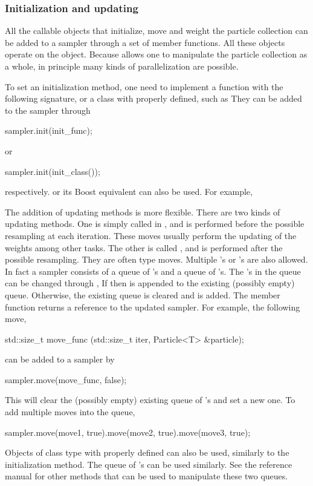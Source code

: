 \subsubsection{Initialization and updating}
\label{ssub:Initialization and updating}

All the callable objects that initialize, move and weight the particle
collection can be added to a sampler through a set of member functions. All
these objects operate on the  object. Because \vsmc
allows one to manipulate the particle collection as a whole, in principle many
kinds of parallelization are possible.

To set an initialization method, one need to implement a function with the
following signature,
or a class with  properly defined, such as
They can be added to the sampler through
\begin{cppcode}
sampler.init(init_func);
\end{cppcode}
or
\begin{cppcode}
sampler.init(init_class());
\end{cppcode}
respectively. \cppoo{}  or its Boost equivalent
 can also be used. For example,

The addition of updating methods is more flexible. There are two kinds of
updating methods. One is simply called  in \vsmc, and is performed
before the possible resampling at each iteration. These moves usually perform
the updating of the weights among other tasks. The other is called
, and is performed after the possible resampling. They are often
\mcmc type moves. Multiple 's or 's are also allowed. In
fact a \vsmc sampler consists of a queue of 's and a queue of
's. The 's in the queue can be changed through
,
If  then  is appended to the existing
(possibly empty) queue. Otherwise, the existing queue is cleared and
 is added. The member function returns a reference to the
updated sampler. For example, the following move,
\begin{cppcode}
std::size_t move_func (std::size_t iter, Particle<T> &particle);
\end{cppcode}
can be added to a sampler by
\begin{cppcode}
sampler.move(move_func, false);
\end{cppcode}
This will clear the (possibly empty) existing queue of 's and set a
new one. To add multiple moves into the queue,
\begin{cppcode}
sampler.move(move1, true).move(move2, true).move(move3, true);
\end{cppcode}
Objects of class type with  properly defined can also be
used, similarly to the initialization method. The queue of 's can
be used similarly. See the reference manual for other methods that can be used
to manipulate these two queues.

